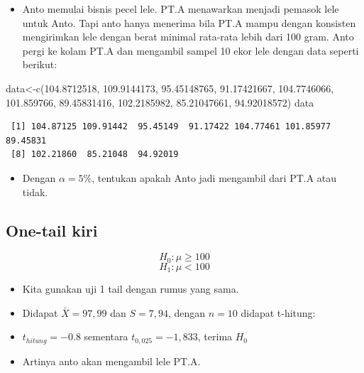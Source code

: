\documentclass[
  letterpaper,
  DIV=11,
  numbers=noendperiod]{scrartcl}
\newenvironment{Shaded}{\begin{snugshade}}{\end{snugshade}}
\newcommand{\FloatTok}[1]{\textcolor[rgb]{0.68,0.00,0.00}{#1}}
\newcommand{\FunctionTok}[1]{\textcolor[rgb]{0.28,0.35,0.67}{#1}}
\newcommand{\NormalTok}[1]{\textcolor[rgb]{0.00,0.23,0.31}{#1}}
\newcommand{\OtherTok}[1]{\textcolor[rgb]{0.00,0.23,0.31}{#1}}
\providecommand{\tightlist}{%
  \setlength{\itemsep}{0pt}\setlength{\parskip}{0pt}}\usepackage{longtable,booktabs,array}
\begin{document}
\begin{itemize}
\tightlist
\item
  Anto memulai bisnis pecel lele. PT.A menawarkan menjadi pemasok lele
  untuk Anto. Tapi anto hanya menerima bila PT.A mampu dengan konsisten
  mengirimkan lele dengan berat minimal rata-rata lebih dari 100 gram.
  Anto pergi ke kolam PT.A dan mengambil sampel 10 ekor lele dengan data
  seperti berikut:
\end{itemize}

\begin{Shaded}
\begin{Highlighting}[]
\NormalTok{data}\OtherTok{\textless{}{-}}\FunctionTok{c}\NormalTok{(}\FloatTok{104.8712518}\NormalTok{,    }\FloatTok{109.9144173}\NormalTok{,    }\FloatTok{95.45148765}\NormalTok{,    }\FloatTok{91.17421667}\NormalTok{,    }\FloatTok{104.7746066}\NormalTok{,    }\FloatTok{101.859766}\NormalTok{, }\FloatTok{89.45831416}\NormalTok{,    }\FloatTok{102.2185982}\NormalTok{,    }\FloatTok{85.21047661}\NormalTok{,    }\FloatTok{94.92018572}\NormalTok{)}
\NormalTok{data}
\end{Highlighting}
\end{Shaded}

\begin{verbatim}
 [1] 104.87125 109.91442  95.45149  91.17422 104.77461 101.85977  89.45831
 [8] 102.21860  85.21048  94.92019
\end{verbatim}

\begin{itemize}
\tightlist
\item
  Dengan \(\alpha=5\%\), tentukan apakah Anto jadi mengambil dari PT.A
  atau tidak.
\end{itemize}

\subsection{One-tail kiri}\label{one-tail-kiri}

\[
H_0: \mu \geq 100
\] \[
H_1: \mu < 100
\]

\begin{itemize}
\item
  Kita gunakan uji 1 tail dengan rumus yang sama.
\item
  Didapat \(\bar{X}=97,99\) dan \(S=7,94\), dengan \(n=10\) didapat
  t-hitung:
\item
  \(t_{hitung}=-0.8\) sementara \(t_{0,025}=-1,833\), terima \(H_0\)
\item
  Artinya anto akan mengambil lele PT.A.
\end{itemize}
\end{document}
